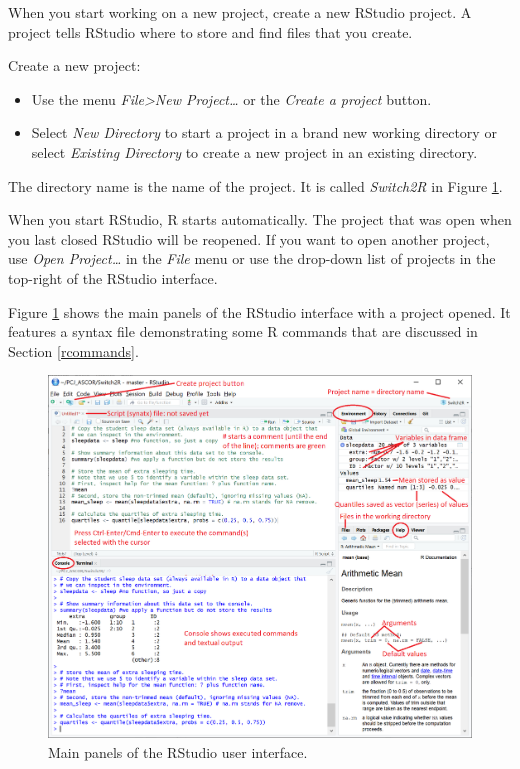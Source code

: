 \documentclass[doc,floatsintext]{apa6}
\providecommand{\tightlist}{%
  \setlength{\itemsep}{0pt}\setlength{\parskip}{0pt}}
\begin{document}
When you start working on a new project, create a new RStudio project. A
project tells RStudio where to store and find files that you create.

Create a new project:

\begin{itemize}
\tightlist
\item
  Use the menu \emph{File\textgreater{}New Project\ldots{}} or the
  \emph{Create a project} button.
\item
  Select \emph{New Directory} to start a project in a brand new working
  directory or select \emph{Existing Directory} to create a new project
  in an existing directory.
\end{itemize}

The directory name is the name of the project. It is called
\emph{Switch2R} in Figure \ref{fig:RStudio}.

When you start RStudio, R starts automatically. The project that was
open when you last closed RStudio will be reopened. If you want to open
another project, use \emph{Open Project\ldots{}} in the \emph{File} menu
or use the drop-down list of projects in the top-right of the RStudio
interface.

Figure \ref{fig:RStudio} shows the main panels of the RStudio interface
with a project opened. It features a syntax file demonstrating some R
commands that are discussed in Section \ref{rcommands}.

\begin{figure}[H]
\includegraphics[width=5.9in]{RStudio} \caption{Main panels of the RStudio user interface.}\label{fig:RStudio}
\end{figure}
\end{document}
